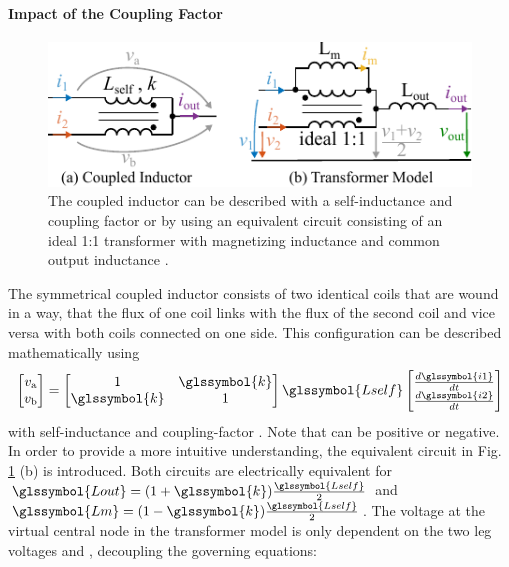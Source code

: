 \documentclass{IPEC2026}
\newcommand{\sbl}[1]{\glssymbol{#1}}
\begin{document}
\paragraph{Impact of the Coupling Factor}
\begin{figure}
  \includegraphics[width=0.9\columnwidth]{figures/Inkscape/Transformer-Model.pdf}
  \caption{The coupled inductor can be described with a self-inductance \sbl{Lself} and coupling factor \sbl{k} or by using an equivalent circuit consisting of an ideal 1:1 transformer with magnetizing inductance \sbl{Lm} and common output inductance \sbl{Lout}.}
  \label{fig:InductorModel}
\end{figure}
The symmetrical coupled inductor consists of two identical coils that are wound in a way, that the flux of one coil links with the flux of the second coil and vice versa with both coils connected on one side. This configuration can be described mathematically using 
\begin{equation}
  \label{eq:StandardCoupling}
  \begin{bmatrix} v_\mathrm a \\ v_\mathrm b \end{bmatrix} = \begin{bmatrix} 1 & \sbl{k} \\ \sbl{k} & 1 \end{bmatrix} \sbl{Lself} \begin{bmatrix} \frac{d\sbl{i1}}{dt}  \\ \frac{d\sbl{i2}}{dt} \end{bmatrix}
\end{equation}
with self-inductance \sbl{Lself} and coupling-factor \sbl{k}. Note that \sbl{k} can be positive or negative.
In order to provide a more intuitive understanding, the equivalent circuit in Fig. \ref{fig:InductorModel} (b) is introduced. Both circuits are electrically equivalent for $\sbl{Lout} = (1+\sbl{k})\frac{\sbl{Lself}}{2}$ and $\sbl{Lm} = (1-\sbl{k})\frac{\sbl{Lself}}{2}$.
The voltage at the virtual central node in the transformer model is only dependent on the two leg voltages \sbl{v1} and \sbl{v2}, decoupling the governing equations:
\end{document}

